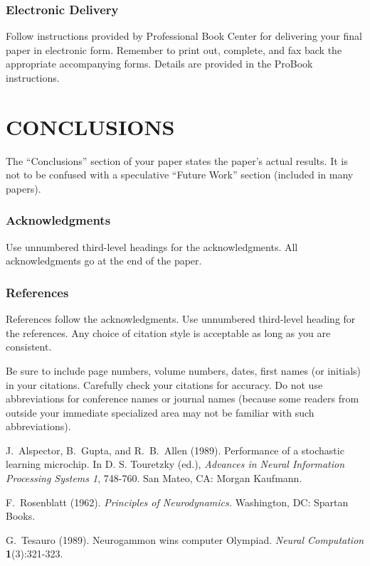 \subsubsection{Electronic Delivery}

Follow instructions provided by Professional Book Center for delivering
your final paper in electronic form. Remember to print out, complete,
and fax back the appropriate accompanying forms. Details are provided in
the ProBook instructions.

\section{CONCLUSIONS}

The ``Conclusions'' section of your paper states the paper's actual results.
It is not to be confused with a speculative ``Future Work'' section (included
in many papers).

\subsubsection*{Acknowledgments}

Use unnumbered third-level headings for the acknowledgments.  All
acknowledgments go at the end of the paper.

\subsubsection*{References}

References follow the acknowledgments.  Use unnumbered third-level
heading for the references.  Any choice of citation style is acceptable
as long as you are consistent.

Be sure to include page numbers, volume numbers, dates, first names
(or initials) in your citations. Carefully check your citations for
accuracy. Do not use abbreviations for conference names or journal names
(because some readers from outside your immediate specialized area may not
be familiar with such abbreviations).

J.~Alspector, B.~Gupta, and R.~B.~Allen  (1989). Performance of a
stochastic learning microchip.  In D. S. Touretzky (ed.), {\it Advances
in Neural Information Processing Systems 1}, 748-760.  San Mateo, CA:
Morgan Kaufmann.

F.~Rosenblatt (1962). {\it Principles of Neurodynamics.} Washington,
DC: Spartan Books.

G.~Tesauro (1989). Neurogammon wins computer Olympiad.  {\it Neural
Computation} {\bf 1}(3):321-323.



